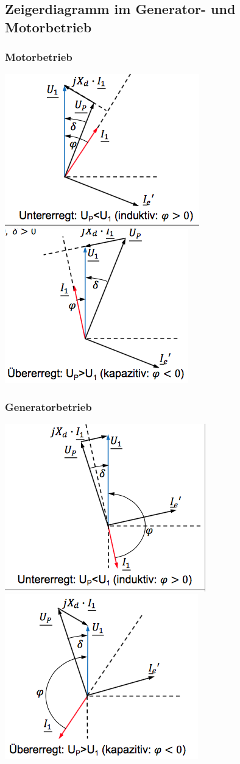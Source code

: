 \subsection{Zeigerdiagramm im Generator- und Motorbetrieb}
\begin{minipage}{0.5 \linewidth}
\subsubsection{Motorbetrieb}
\includegraphics[width = 0.5 \linewidth]{./Pics/VL1011/motuntererregt}
\includegraphics[width = 0.5 \linewidth]{./Pics/VL1011/motuebererregt}
\end{minipage}
\begin{minipage}{0.5 \linewidth}
\subsubsection{Generatorbetrieb}
\includegraphics[width = 0.5 \linewidth]{./Pics/VL1011/genuntererregt}
\includegraphics[width = 0.5 \linewidth]{./Pics/VL1011/genuebererregt}
\end{minipage}

